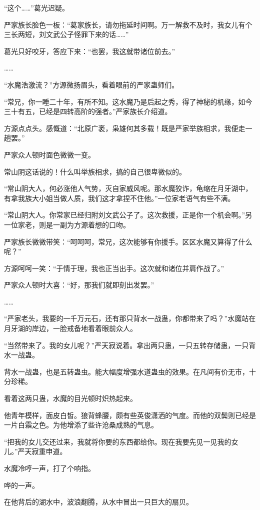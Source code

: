 \begin{this_body}
“这个……”葛光迟疑。

严家族长脸色一板：“葛家族长，请勿拖延时间啊。万一解救不及时，我女儿有个三长两短，刘文武公子怪罪下来的话……”

葛光只好咬牙，答应下来：“也罢，我这就带诸位前去。”

……

“水魔浩激流？”方源微扬眉头，看着眼前的严家蛊师们。

“常兄，你一睡二十年，有所不知。这水魔乃是后起之秀，得了神秘的机缘，如今三十有五，已经是四转高阶的强者。”严家族长介绍道。

方源点点头。感慨道：“北原广袤，枭雄何其多载！既是严家举族相求，我便走一趟罢。”

严家众人顿时面色微微一变。

常山阴这话说的！什么叫举族相求，搞的自己很卑微似的。

“常山阴大人，何必涨他人气势，灭自家威风呢。那水魔狡诈，龟缩在月牙湖中，有拿我族大小姐当做人质，我们这才拿捏不住他。”一位家老语气有些不满。

“常山阴大人。你常家已经归附刘文武公子了。这次救援，正是你一个机会啊。”另一位家老，则是一副为方源着想的口吻。

严家族长微微带笑：“呵呵呵，常兄，这次能够有你援手。区区水魔又算得了什么呢？”

方源呵呵一笑：“于情于理，我也正当出手。这次就和诸位并肩作战了。”

严家众人顿时大喜：“好，那我们就即刻出发罢。”

……

“严家老头，我要的一千万元石，还有那只背水一战蛊，你都带来了吗？”水魔站在月牙湖的岸边，一脸戒备地看着眼前众人。

“当然带来了。我的女儿呢？”严天寂说着。拿出两只蛊，一只五转存储蛊，一只背水一战蛊。

背水一战蛊，也是五转蛊虫。能大幅度增强水道蛊虫的效果。在凡间有价无市，十分珍稀。

看着这两只蛊，水魔的目光顿时炽热起来。

他青年模样，面皮白皙。狼背蜂腰，颇有些英俊潇洒的气度。而他的双鬓则已经是一片白霜之色。为他增添了些许沧桑成熟的气息。

“把我的女儿交还过来，我就将你要的东西都给你。现在我要先见一见我的女儿。”严天寂重申道。

水魔冷哼一声，打了个响指。

哗的一声。

在他背后的湖水中，波浪翻腾，从水中冒出一只巨大的扇贝。


\end{this_body}
